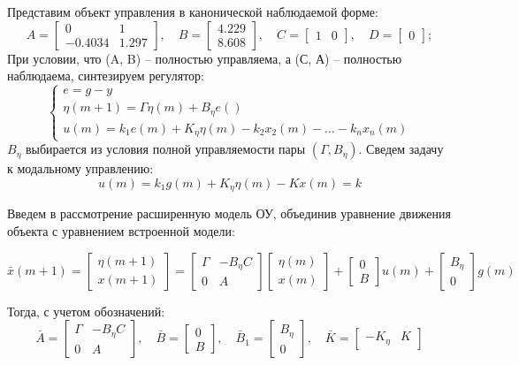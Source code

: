 \documentclass[a4paper, 14pt]{extarticle}
\theoremstyle{definition}
\theoremstyle{plain}
\theoremstyle{remark}
\begin{document}
Представим объект управления в канонической наблюдаемой форме:
\[
    A = \begin{bmatrix} 0 & 1 \\ -0.4034 & 1.297 \end{bmatrix}, \quad
    B = \begin{bmatrix} 4.229 \\ 8.608 \end{bmatrix}, \quad
    C = \begin{bmatrix} 1 & 0 \end{bmatrix}, \quad
    D = \begin{bmatrix} 0 \end{bmatrix};
\]
При условии, что (A, B) -- полностью управляема, а (С, А) -- полностью наблюдаема, синтезируем регулятор:
\[
\begin{cases}
	e = g - y\\
	\eta(m+1) = \Gamma \eta(m) + B_\eta e() \\
	u(m) = k_1 e(m) + K_\eta \eta(m) - k_2 x_2(m) - \dots - k_n x_n(m)
\end{cases}
\]
\(B_\eta\) выбирается из условия полной управляемости пары \((\Gamma, B_\eta)\). Сведем задачу к модальному управлению:
\[u(m) = k_1 g(m) + K_\eta \eta(m) - K x(m) = k\]

Введем в рассмотрение расширенную модель ОУ, объединив уравнение движения объекта с уравнением встроенной модели:

\[
\bar{x}(m + 1) = 
\begin{bmatrix}
\eta(m + 1) \\ x(m + 1)
\end{bmatrix}
= 
\begin{bmatrix}
\Gamma & -B_\eta C \\
0 & A 
\end{bmatrix}
\begin{bmatrix}
\eta(m) \\ x(m)
\end{bmatrix}
+ 
\begin{bmatrix}
0 \\ B 
\end{bmatrix} u(m)
+ 
\begin{bmatrix}
B_\eta \\ 0 
\end{bmatrix} g(m)
\]

Тогда, с учетом обозначений:
\[
\bar{A} = \begin{bmatrix} \Gamma & -B_\eta C \\ 0 & A \end{bmatrix}, \quad
\bar{B} = \begin{bmatrix} 0 \\ B \end{bmatrix}, \quad
\bar{B}_1 = \begin{bmatrix} B_\eta \\ 0 \end{bmatrix}, \quad
\bar{K} = \begin{bmatrix} -K_\eta & K \end{bmatrix}
\]
\end{document}
